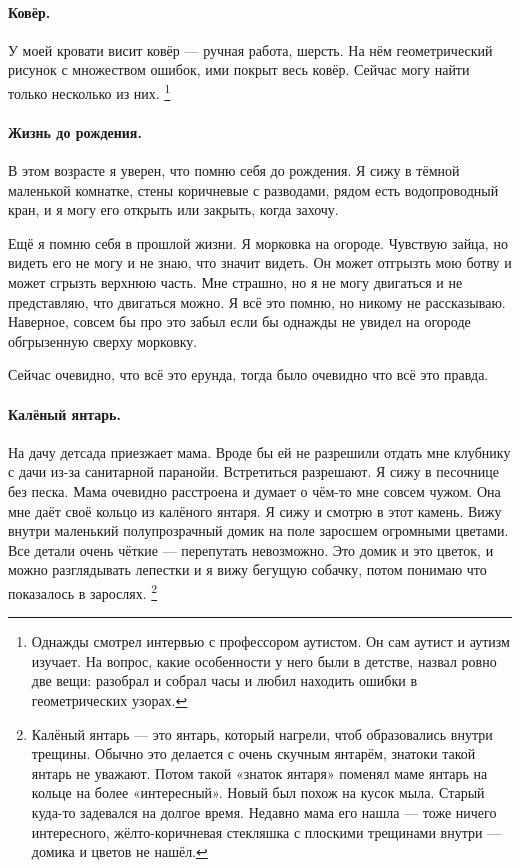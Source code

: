 \documentclass{book}
\begin{document}
\paragraph{Ковёр.}
У моей кровати висит ковёр ---
ручная работа, шерсть.
На нём геометрический рисунок с множеством ошибок, 
ими покрыт весь ковёр.
Сейчас могу найти только несколько из них.%
\footnote{Однажды смотрел интервью с профессором аутистом.
Он сам аутист и аутизм изучает.
На вопрос, какие особенности у него были в детстве, назвал ровно две вещи: разобрал и собрал часы и любил находить ошибки в геометрических узорах.}

\paragraph{Жизнь до рождения.}
В этом возрасте я уверен, что помню себя до рождения.
Я сижу в тёмной маленькой комнатке,
стены коричневые с разводами,
рядом есть водопроводный кран, и я могу его открыть или закрыть, когда захочу.

Ещё я помню себя в прошлой жизни.
Я морковка на огороде.
Чувствую зайца, но видеть его не могу и не знаю, что значит видеть.
Он может отгрызть мою ботву и может сгрызть верхнюю часть.
Мне страшно, но я не могу двигаться и не представляю, что двигаться можно.
Я всё это помню, но никому не рассказываю.
Наверное, совсем бы про это забыл если бы однажды не увидел 
на огороде обгрызенную сверху морковку.

Сейчас очевидно, что всё это ерунда,
тогда было очевидно что всё это правда.

\paragraph{Калёный янтарь.}
На дачу детсада приезжает мама.
Вроде бы ей не разрешили отдать мне клубнику с дачи из-за санитарной паранойи.
Встретиться разрешают.
Я сижу в песочнице без песка.
Мама очевидно расстроена и думает о чём-то мне совсем чужом.
Она мне даёт своё кольцо из калёного янтаря.
Я сижу и смотрю в этот камень.
Вижу внутри маленький полупрозрачный домик
на поле заросшем огромными цветами.
Все детали очень чёткие --- перепутать невозможно.
Это домик и это цветок, 
и можно разглядывать лепестки и я вижу бегущую собачку, потом понимаю что показалось в зарослях.%
\footnote{Калёный янтарь --- это янтарь, который нагрели, чтоб образовались внутри трещины.
Обычно это делается с очень скучным янтарём,
знатоки такой янтарь не уважают.
Потом такой «знаток янтаря» поменял маме янтарь на кольце на более «интересный».
Новый был похож на кусок мыла.
Старый куда-то задевался на долгое время.
Недавно мама его нашла --- тоже ничего интересного,
жёлто-коричневая стекляшка с плоскими трещинами внутри --- домика и цветов не нашёл.}
\end{document}
